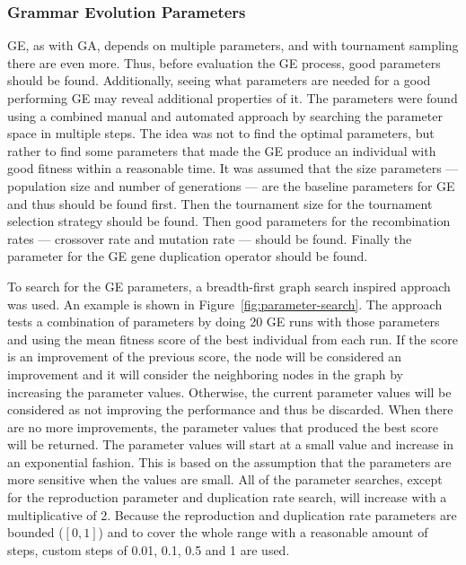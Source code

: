 
\subsubsection{Grammar Evolution Parameters}
GE, as with GA, depends on multiple parameters, and with tournament sampling there are even more.
Thus, before evaluation the GE process, good parameters should be found.
Additionally, seeing what parameters are needed for a good performing GE may reveal additional properties of it.
The parameters were found using a combined manual and automated approach by searching the parameter space in multiple steps.
The idea was not to find the optimal parameters, but rather to find some parameters that made the GE produce an individual with good fitness within a reasonable time.
It was assumed that the size parameters --- population size and number of generations --- are the baseline parameters for GE and thus should be found first.
Then the tournament size for the tournament selection strategy should be found.
Then good parameters for the recombination rates --- crossover rate and mutation rate --- should be found.
Finally the parameter for the GE gene duplication operator should be found.

To search for the GE parameters, a breadth-first graph search inspired approach was used.
An example is shown in Figure~\ref{fig:parameter-search}.
The approach tests a combination of parameters by doing 20 GE runs with those parameters and using the mean fitness score of the best individual from each run.
If the score is an improvement of the previous score, the node will be considered an improvement and it will consider the neighboring nodes in the graph by increasing the parameter values.
Otherwise, the current parameter values will be considered as not improving the performance and thus be discarded.
When there are no more improvements, the parameter values that produced the best score will be returned.
The parameter values will start at a small value and increase in an exponential fashion.
This is based on the assumption that the parameters are more sensitive when the values are small.
All of the parameter searches, except for the reproduction parameter and duplication rate search, will increase with a multiplicative of 2.
Because the reproduction and duplication rate parameters are bounded ($[0, 1]$) and to cover the whole range with a reasonable amount of steps, custom steps of 0.01, 0.1, 0.5 and 1 are used.

